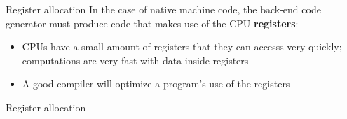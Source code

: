 \documentclass[../index.tex]{subfiles}
\begin{document}
\renewcommand{\currenttitle}{Register allocation}
\begin{frame}[fragile]{\currenttitle}
  In the case of native machine code, the back-end code generator must produce
  code that makes use of the CPU \textbf{registers}:

  \only<+->{}
  \begin{itemize}
    \item<+-> CPUs have a small amount of registers that they can accesss very
      quickly; computations are very fast with data inside registers
    \item<+-> A good compiler will optimize a program's use of the registers
  \end{itemize}
\end{frame}

\begin{frame}[fragile]{\currenttitle}
\end{frame}

\end{document}

